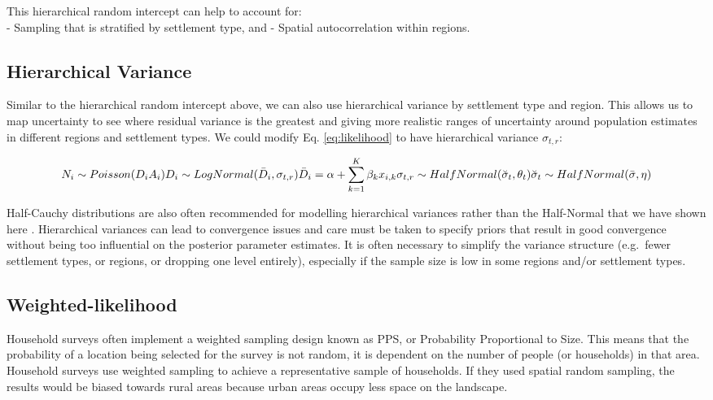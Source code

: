 \documentclass[]{book}
\begin{document}
This hierarchical random intercept can help to account for:\\
- Sampling that is stratified by settlement type, and - Spatial
autocorrelation within regions.

\subsection{Hierarchical Variance}\label{hierarchical-variance}

Similar to the hierarchical random intercept above, we can also use
hierarchical variance by settlement type and region. This allows us to
map uncertainty to see where residual variance is the greatest and
giving more realistic ranges of uncertainty around population estimates
in different regions and settlement types. We could modify Eq.
\eqref{eq:likelihood} to have hierarchical variance \(\sigma_{t,r}\):

\begin{equation}
  N_i \sim Poisson( D_i A_i ) \\
  D_i \sim LogNormal( \bar{D}_i, \sigma_{t,r}) \\
  \bar{D}_i = \alpha + \sum_{k=1}^{K} \beta_k x_{i,k} \\
  \sigma_{t,r} \sim HalfNormal( \breve{\sigma}_t, \theta_t ) \\
  \breve{\sigma}_t \sim HalfNormal( \bar{\sigma}, \eta )
  \label{eq:variance}
\end{equation}

Half-Cauchy distributions are also often recommended for modelling
hierarchical variances rather than the Half-Normal that we have shown
here \citep{gelman2013bayesian}. Hierarchical variances can lead to
convergence issues and care must be taken to specify priors that result
in good convergence without being too influential on the posterior
parameter estimates. It is often necessary to simplify the variance
structure (e.g.~fewer settlement types, or regions, or dropping one
level entirely), especially if the sample size is low in some regions
and/or settlement types.

\subsection{Weighted-likelihood}\label{weighted-likelihood}

Household surveys often implement a weighted sampling design known as
PPS, or Probability Proportional to Size. This means that the
probability of a location being selected for the survey is not random,
it is dependent on the number of people (or households) in that area.
Household surveys use weighted sampling to achieve a representative
sample of households. If they used spatial random sampling, the results
would be biased towards rural areas because urban areas occupy less
space on the landscape.
\end{document}
